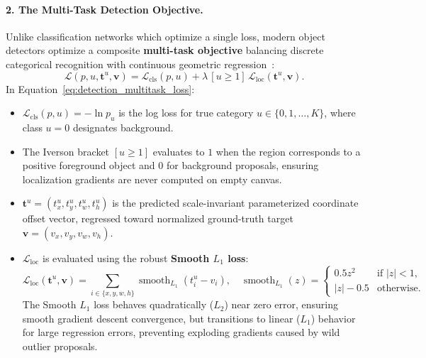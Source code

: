 \paragraph{2. The Multi-Task Detection Objective.}
Unlike classification networks which optimize a single loss, modern object detectors optimize a composite \textbf{multi-task objective} balancing discrete categorical recognition with continuous geometric regression~\cite{girshick2015fast}:
\begin{equation}
\mathcal{L}(p, u, \mathbf{t}^u, \mathbf{v}) = \mathcal{L}_{\text{cls}}(p, u) + \lambda \, [u \ge 1] \, \mathcal{L}_{\text{loc}}(\mathbf{t}^u, \mathbf{v}).
\label{eq:detection_multitask_loss}
\end{equation}
In Equation~\eqref{eq:detection_multitask_loss}:
\begin{itemize}[leftmargin=*]
  \item $\mathcal{L}_{\text{cls}}(p, u) = -\ln p_u$ is the log loss for true category $u \in \{0, 1, \dots, K\}$, where class $u=0$ designates background.
  \item The Iverson bracket $[u \ge 1]$ evaluates to $1$ when the region corresponds to a positive foreground object and $0$ for background proposals, ensuring localization gradients are never computed on empty canvas.
  \item $\mathbf{t}^u = (t_x^u, t_y^u, t_w^u, t_h^u)$ is the predicted scale-invariant parameterized coordinate offset vector, regressed toward normalized ground-truth target $\mathbf{v} = (v_x, v_y, v_w, v_h)$.
  \item $\mathcal{L}_{\text{loc}}$ is evaluated using the robust \textbf{Smooth $L_1$ loss}:
    \begin{equation}
    \mathcal{L}_{\text{loc}}(\mathbf{t}^u, \mathbf{v}) = \sum_{i \in \{x, y, w, h\}} \operatorname{smooth}_{L_1}(t_i^u - v_i), \quad \operatorname{smooth}_{L_1}(z) = \begin{cases} 0.5 z^2 & \text{if } |z| < 1, \\ |z| - 0.5 & \text{otherwise.} \end{cases}
    \label{eq:smooth_l1_loss}
    \end{equation}
    The Smooth $L_1$ loss behaves quadratically ($L_2$) near zero error, ensuring smooth gradient descent convergence, but transitions to linear ($L_1$) behavior for large regression errors, preventing exploding gradients caused by wild outlier proposals.
\end{itemize}

